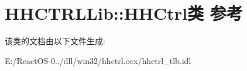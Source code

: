 \hypertarget{class_h_h_c_t_r_l_lib_1_1_h_h_ctrl}{}\section{H\+H\+C\+T\+R\+L\+Lib\+:\+:H\+H\+Ctrl类 参考}
\label{class_h_h_c_t_r_l_lib_1_1_h_h_ctrl}


该类的文档由以下文件生成\+:\begin{DoxyCompactItemize}
\item 
E\+:/\+React\+O\+S-\/0../dll/win32/hhctrl.\+ocx/hhctrl\+\_\+tlb.\+idl\end{DoxyCompactItemize}
